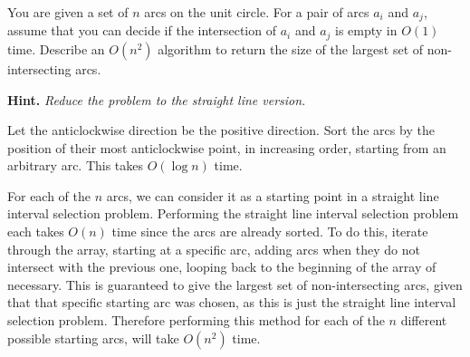 \documentclass{article}
\begin{document}
\begin{question}
You are given a set of $n$ arcs on the unit circle. For a pair of arcs $a_i$ and $a_j$, assume that you can decide if the intersection of $a_i$ and $a_j$ is empty in $O(1)$ time. Describe an $O(n^2)$ algorithm to return the size of the largest set of non-intersecting arcs.

{\bfseries Hint.} {\em Reduce the problem to the straight line version.}
\end{question}

\begin{solution}
Let the anticlockwise direction be the positive direction.
Sort the arcs by the position of their most anticlockwise point, in increasing order,
starting from an arbitrary arc. This takes $O(\log n)$ time.

For each of the $n$ arcs, we can consider it as a starting point in a straight line interval selection problem.
Performing the straight line interval selection problem 
each takes $O(n)$ time since the arcs are already sorted. 
To do this, iterate through the array, starting at a specific arc, adding arcs when they do not intersect with the previous one,
looping back to the beginning of the array of necessary.
This is guaranteed to give the largest set of non-intersecting arcs, given that that specific starting arc was chosen,
as this is just the straight line interval selection problem.
Therefore performing this method for each of the $n$ different possible starting arcs,
will take $O(n^2)$ time.
    
\end{solution}
\end{document}
